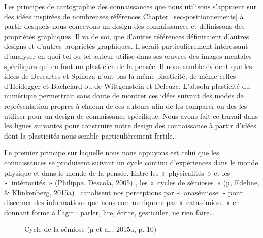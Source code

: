 \documentclass[
  a4paper,
  DIV=11,
  numbers=noendperiod]{scrreprt}
\begin{document}
Les principes de cartographie des connaissances que nous utilisons
s'appuient sur des idées inspirées de nombreuses références
Chapter~\ref{sec-positionnements} à partir desquels nous concevons un
design des connaissances et définissons des propriétés graphiques. Il va
de soi, que d'autres références définiraient d'autres designs et
d'autres propriétés graphiques. Il serait particulièrement intéressant
d'analyser en quoi tel ou tel auteur utilise dans ses œuvres des images
mentales spécifiques qui en font un plasticien de la pensée. Il nous
semble évident que les idées de Descartes et Spinoza n'ont pas la même
plasticité, de même celles d'Heidegger et Bachelard ou de Wittgenstein
et Deleuze. L'absolu plasticité du numérique permettrait sans doute de
montrer ces idées suivant des modes de représentation propres à chacun
de ces auteurs afin de les comparer ou des les utiliser pour un design
de connaissance spécifique. Nous avons fait ce travail dans les lignes
suivantes pour construire notre design des connaissance à partir d'idées
dont la plasticités nous semble particulièrement fertile.

Le premier principe sur laquelle nous nous appuyons est celui que les
connaissances se produisent suivant un cycle continu d'expériences dans
le monde physique et dans le monde de la pensée. Entre les
«~physicalités~» et les «~intériorités~» (Philippe. Descola, 2005) , les
«~cycles de sémioses~» (µ, Edeline, \& Klinkenberg, 2015a)~ canalisent
nos perceptions par «~anasémiose~» pour discerner des informations que
nous communiquons par «~catasémiose~» en donnant forme à l'agir :
parler, lire, écrire, gesticuler, ne rien faire\ldots{}

\begin{figure}


\caption{\label{fig-cyclesemiose}Cycle de la sémiose (µ et al., 2015a,
p. 10)}

\end{figure}%
\end{document}
